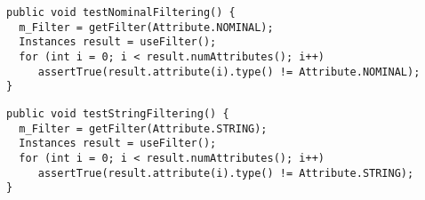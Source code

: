 \begin{lstlisting}
public void testNominalFiltering() {
  m_Filter = getFilter(Attribute.NOMINAL);
  Instances result = useFilter();
  for (int i = 0; i < result.numAttributes(); i++)
     assertTrue(result.attribute(i).type() != Attribute.NOMINAL);
}
\end{lstlisting}
\begin{lstlisting}
public void testStringFiltering() {
  m_Filter = getFilter(Attribute.STRING);
  Instances result = useFilter();
  for (int i = 0; i < result.numAttributes(); i++)
     assertTrue(result.attribute(i).type() != Attribute.STRING);
}
\end{lstlisting}

